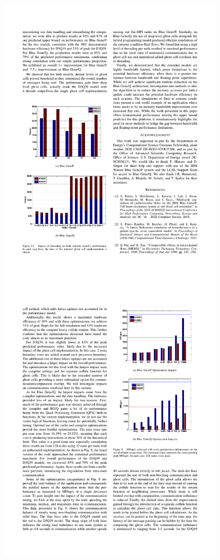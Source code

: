 \begin{frame}
\begin{figure}[ht!]
\centering
\includegraphics[scale=0.49]{plots/TasksThreadsLBM_BGQresults}\includegraphics[scale=0.49]{plots/LBM_PerfOpts_BGQ}

\end{figure}
\end{frame}
